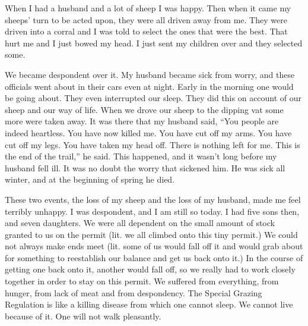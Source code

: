When I had a husband and a lot of sheep I was happy. Then when it came my sheeps' turn to be acted upon, they were all driven away from me. They were driven into a corral and I was told to select the ones that were the best. That hurt me and I just bowed my head. I just sent my children over and they selected some.

We became despondent over it. My husband became sick from worry, and these officials went about in their cars even at night. Early in the morning one would be going about. They even interrupted our sleep. They did this on account of our sheep and our way of life. When we drove our sheep to the dipping vat some more were taken away. It was there that my husband said, ``You people are indeed heartless. You have now killed me. You have cut off my arms. You have cut off my legs. You have taken my head off. There is nothing left for me. This is the end of the trail,'' he said. This happened, and it wasn't long before my husband fell ill. It was no doubt the worry that sickened him. He was sick all winter, and at the beginning of spring he died.

These two events, the loss of my sheep and the loss of my husband, made me feel terribly unhappy. I was despondent, and I am still so today. I had five sons then, and seven daughters. We were all dependent on the small amount of stock granted to us on the permit (lit. we all climbed onto this tiny permit.) We could not always make ends meet (lit. some of us would fall off it and would grab about for something to reestablish our balance and get us back onto it.) In the course of getting one back onto it, another would fall off, so we really had to work closely together in order to stay on this permit. We suffered from everything, from hunger, from lack of meat and from despondency. The Special Grazing Regulation is like a killing disease from which one cannot sleep. We cannot live because of it. One will not walk pleasantly.